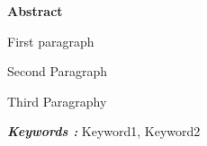 \begin{center}
	\textbf{\textbf{\fontsize{16pt}{24pt}\selectfont Abstract}}
\end{center}

First paragraph \par
Second Paragraph \par
Third Paragraphy \par
\textbf{\textit{Keywords : }} Keyword1, Keyword2
